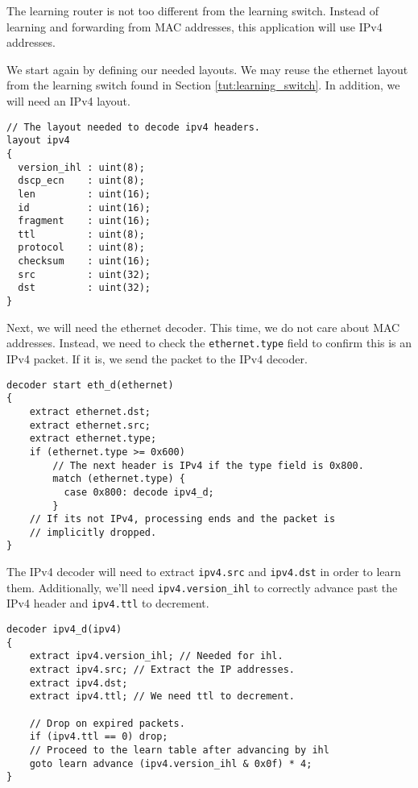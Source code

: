 The learning router is not too different from the learning switch. Instead of learning and forwarding from MAC addresses, this application will use IPv4 addresses.

We start again by defining our needed layouts. We may reuse the ethernet layout from the learning switch found in Section \ref{tut:learning_switch}. In addition, we will need an IPv4 layout.

\begin{codepage}
\begin{lstlisting}
// The layout needed to decode ipv4 headers.
layout ipv4
{
  version_ihl : uint(8);
  dscp_ecn    : uint(8); 
  len         : uint(16);
  id          : uint(16);
  fragment    : uint(16);
  ttl         : uint(8);
  protocol    : uint(8);
  checksum    : uint(16);
  src         : uint(32);
  dst         : uint(32);
}
\end{lstlisting}
\end{codepage}

Next, we will need the ethernet decoder. This time, we do not care about MAC addresses. Instead, we need to check the \texttt{ethernet.type} field to confirm this is an IPv4 packet. If it is, we send the packet to the IPv4 decoder.

\begin{codepage}
\begin{lstlisting}
decoder start eth_d(ethernet)
{
	extract ethernet.dst;
	extract ethernet.src;
	extract ethernet.type;
	if (ethernet.type >= 0x600)
	  	// The next header is IPv4 if the type field is 0x800.
	    match (ethernet.type) {
	      case 0x800: decode ipv4_d;
	    }
	// If its not IPv4, processing ends and the packet is
	// implicitly dropped.
}
\end{lstlisting}
\end{codepage}

The IPv4 decoder will need to extract \texttt{ipv4.src} and \texttt{ipv4.dst} in order to learn them. Additionally, we'll need \texttt{ipv4.version\_ihl} to correctly advance past the IPv4 header and \texttt{ipv4.ttl} to decrement.

\begin{codepage}
\begin{lstlisting}
decoder ipv4_d(ipv4)
{
	extract ipv4.version_ihl; // Needed for ihl.
	extract ipv4.src; // Extract the IP addresses.
	extract ipv4.dst;
	extract ipv4.ttl; // We need ttl to decrement.
  
	// Drop on expired packets.
	if (ipv4.ttl == 0) drop;
	// Proceed to the learn table after advancing by ihl
	goto learn advance (ipv4.version_ihl & 0x0f) * 4;
}
\end{lstlisting}
\end{codepage}

